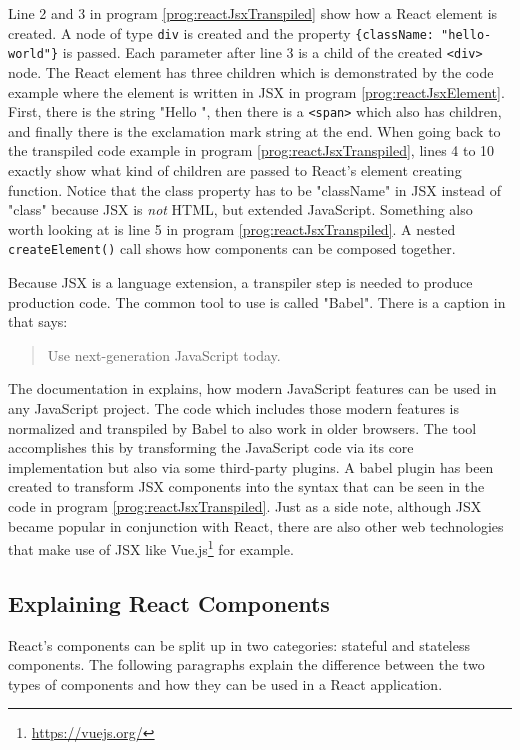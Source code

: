 Line 2 and 3 in program \ref{prog:reactJsxTranspiled} show how a React element is created. A node of type \texttt{div} is created and the property \texttt{\{className: "hello-world"\}} is passed. Each parameter after line 3 is a child of the created \texttt{<div>} node. The React element has three children which is demonstrated by the code example where the element is written in JSX in program \ref{prog:reactJsxElement}. First, there is the string "Hello ", then there is a \texttt{<span>} which also has children, and finally there is the exclamation mark string at the end. When going back to the transpiled code example in program \ref{prog:reactJsxTranspiled}, lines 4 to 10 exactly show what kind of children are passed to React's element creating function. Notice that the class property has to be "className" in JSX instead of "class" because JSX is \emph{not} HTML, but extended JavaScript. Something also worth looking at is line 5 in program \ref{prog:reactJsxTranspiled}. A nested \texttt{createElement()} call shows how components can be composed together.

Because JSX is a language extension, a transpiler step is needed to produce production code. The common tool to use is called "Babel". There is a caption in \cite{Babel} that says: \begin{quote}\begin{english}Use next-generation JavaScript today.\end{english}\end{quote} The documentation in \cite[/docs/en]{Babel} explains, how modern JavaScript features can be used in any JavaScript project. The code which includes those modern features is normalized and transpiled by Babel to also work in older browsers. The tool accomplishes this by transforming the JavaScript code via its core implementation but also via some third-party plugins. A babel plugin has been created to transform JSX components into the syntax that can be seen in the code in program \ref{prog:reactJsxTranspiled}. Just as a side note, although JSX became popular in conjunction with React, there are also other web technologies that make use of JSX like Vue.js\footnote{\url{https://vuejs.org/}} for example.

\subsection{Explaining React Components}
\label{sec:reactComponents}

React's components can be split up in two categories: stateful and stateless components. The following paragraphs explain the difference between the two types of components and how they can be used in a React application.

